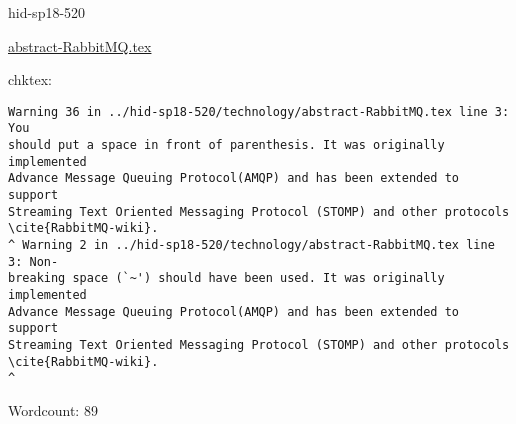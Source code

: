 \begin{IU}

hid-sp18-520

\href{https://github.com/cloudmesh-community/hid-sp18-520/blob/master//technology/abstract-RabbitMQ.tex}{abstract-RabbitMQ.tex}

 
chktex:
\begin{tiny}
\begin{verbatim}
Warning 36 in ../hid-sp18-520/technology/abstract-RabbitMQ.tex line 3: You
should put a space in front of parenthesis. It was originally implemented
Advance Message Queuing Protocol(AMQP) and has been extended to support
Streaming Text Oriented Messaging Protocol (STOMP) and other protocols
\cite{RabbitMQ-wiki}.
^ Warning 2 in ../hid-sp18-520/technology/abstract-RabbitMQ.tex line 3: Non-
breaking space (`~') should have been used. It was originally implemented
Advance Message Queuing Protocol(AMQP) and has been extended to support
Streaming Text Oriented Messaging Protocol (STOMP) and other protocols
\cite{RabbitMQ-wiki}.
^
\end{verbatim}
\end{tiny}

Wordcount: 89

\end{IU}




